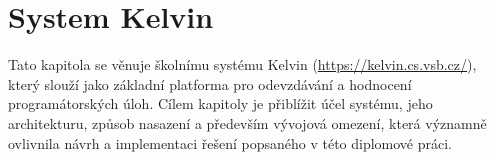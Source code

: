 \chapter{System Kelvin}
\label{ch:kelvin}

Tato kapitola se věnuje školnímu systému Kelvin (\href{https://kelvin.cs.vsb.cz/}{https://kelvin.cs.vsb.cz/}), který slouží jako základní platforma pro odevzdávání a hodnocení programátorských úloh.
Cílem kapitoly je přiblížit účel systému, jeho architekturu, způsob nasazení a především vývojová omezení, která významně ovlivnila návrh a implementaci řešení popsaného v této diplomové práci.






\endinput